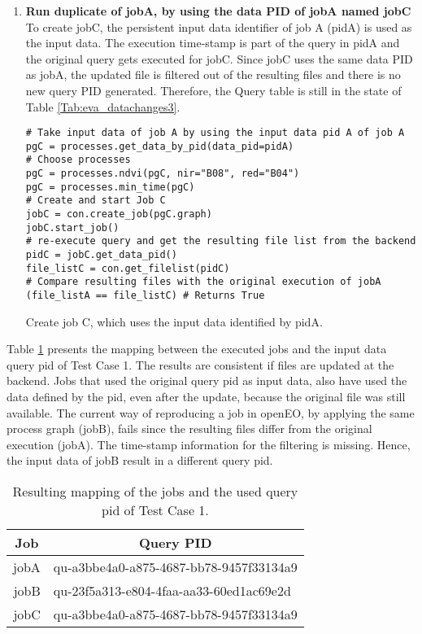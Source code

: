 \documentclass[draft,final]{vutinfth} %
\newenvironment{code}{\captionsetup{type=listing}}{}
\begin{document}
\begin{enumerate}
	\item \textbf{Run duplicate of jobA, by using the data PID of jobA named jobC}\\
	To create jobC, the persistent input data identifier of job A (pidA) is used as the input data. The execution time-stamp is part of the query in pidA and the original query gets executed for jobC. Since jobC uses the same data PID as jobA, the updated file is filtered out of the resulting files and there is no new query PID generated. Therefore, the Query table is still in the state of Table \ref{Tab:eva_datachanges3}. 
	\begin{code}
		\begin{verbatim}
# Take input data of job A by using the input data pid A of job A
pgC = processes.get_data_by_pid(data_pid=pidA)
# Choose processes
pgC = processes.ndvi(pgC, nir="B08", red="B04")
pgC = processes.min_time(pgC)
# Create and start Job C
jobC = con.create_job(pgC.graph)
jobC.start_job()
# re-execute query and get the resulting file list from the backend
pidC = jobC.get_data_pid()
file_listC = con.get_filelist(pidC)
# Compare resulting files with the original execution of jobA
(file_listA == file_listC) # Returns True
		\end{verbatim}
		\caption{Create job C, which uses the input data identified by pidA.}
		\label{lst:eva_datachange_5}
	\end{code}
\end{enumerate}

Table \ref{Tab:eva_datachanges4} presents the mapping between the executed jobs and the input data query pid of Test Case 1. The results are consistent if files are updated at the backend. Jobs that used the original query pid as input data, also have used the data defined by the pid, even after the update, because the original file was still available. The current way of reproducing a job in openEO, by applying the same process graph (jobB), fails since the resulting files differ from the original execution (jobA). The time-stamp information for the filtering is missing. Hence,  the input data of jobB result in a different query pid.     

\begin{table}[]
	\caption{Resulting mapping of the jobs and the used query pid of Test Case 1.}
	\centering
	\begin{tabular}{|r|l|}
		\hline \multicolumn{1}{|c|}{\textbf{Job}}  &  \multicolumn{1}{c|}{\textbf{Query PID}} \\ \hline
		jobA & qu-a3bbe4a0-a875-4687-bb78-9457f33134a9  \\ 
		jobB & qu-23f5a313-e804-4faa-aa33-60ed1ac69e2d \\
		jobC & qu-a3bbe4a0-a875-4687-bb78-9457f33134a9  \\ \hline
	\end{tabular}
	\label{Tab:eva_datachanges4}
\end{table}
\end{document}
